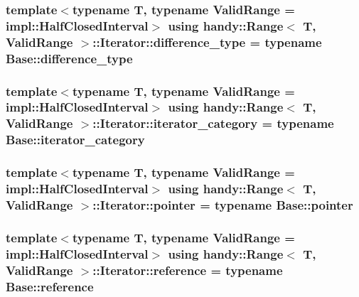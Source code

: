\subsubsection[{\texorpdfstring{difference\+\_\+type}{difference_type}}]{\setlength{\rightskip}{0pt plus 5cm}template$<$typename T, typename Valid\+Range = impl\+::\+Half\+Closed\+Interval$>$ using {\bf handy\+::\+Range}$<$ T, Valid\+Range $>$\+::{\bf Iterator\+::difference\+\_\+type} =  typename Base\+::difference\+\_\+type}\hypertarget{classhandy_1_1Range_1_1Iterator_ac7bf1cb755fa3ca0f213b19f0fdbe8de}{}\label{classhandy_1_1Range_1_1Iterator_ac7bf1cb755fa3ca0f213b19f0fdbe8de}
\subsubsection[{\texorpdfstring{iterator\+\_\+category}{iterator_category}}]{\setlength{\rightskip}{0pt plus 5cm}template$<$typename T, typename Valid\+Range = impl\+::\+Half\+Closed\+Interval$>$ using {\bf handy\+::\+Range}$<$ T, Valid\+Range $>$\+::{\bf Iterator\+::iterator\+\_\+category} =  typename Base\+::iterator\+\_\+category}\hypertarget{classhandy_1_1Range_1_1Iterator_a5e9da733ea7dadc2cc69327288e3e7a2}{}\label{classhandy_1_1Range_1_1Iterator_a5e9da733ea7dadc2cc69327288e3e7a2}
\subsubsection[{\texorpdfstring{pointer}{pointer}}]{\setlength{\rightskip}{0pt plus 5cm}template$<$typename T, typename Valid\+Range = impl\+::\+Half\+Closed\+Interval$>$ using {\bf handy\+::\+Range}$<$ T, Valid\+Range $>$\+::{\bf Iterator\+::pointer} =  typename Base\+::pointer}\hypertarget{classhandy_1_1Range_1_1Iterator_a2a4a02c25dce296702ceb66fe75f9918}{}\label{classhandy_1_1Range_1_1Iterator_a2a4a02c25dce296702ceb66fe75f9918}
\subsubsection[{\texorpdfstring{reference}{reference}}]{\setlength{\rightskip}{0pt plus 5cm}template$<$typename T, typename Valid\+Range = impl\+::\+Half\+Closed\+Interval$>$ using {\bf handy\+::\+Range}$<$ T, Valid\+Range $>$\+::{\bf Iterator\+::reference} =  typename Base\+::reference}\hypertarget{classhandy_1_1Range_1_1Iterator_ab182b2493e468efbced9983e3e38dbe4}{}\label{classhandy_1_1Range_1_1Iterator_ab182b2493e468efbced9983e3e38dbe4}
